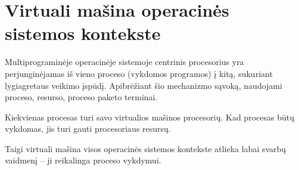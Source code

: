 \section{Virtuali mašina operacinės sistemos kontekste}

Multiprograminėje operacinėje sistemoje centrinis procesorius yra perjunginėjamas iš vieno proceso (vykdomos programos) į kitą, sukuriant lygiagretaus veikimo įspūdį. Apibrėžiant šio mechanizmo sąvoką, naudojami proceso, resurso, proceso paketo terminai.

Kiekvienas procesas turi savo virtualios mašinos procesorių. Kad procesas būtų vykdomas, jis turi gauti procesoriaus resursų. 

Taigi virtuali mašina visos operacinės sistemos kontekste atlieka labai svarbų vaidmenį – ji reikalinga proceso vykdymui.



